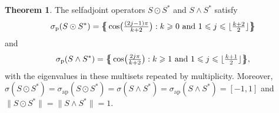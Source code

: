 \documentclass[10pt,reqno]{amsart}
\newcommand{\0}{{\color{lightgray}0}}
\renewcommand{\leq}{\leqslant}
\renewcommand{\geq}{\geqslant}
\newcommand{\norm}[1]{\| #1 \|}
\theoremstyle{definition}
\newtheorem{Theorem}[equation]{Theorem}
\numberwithin{equation}{section}
\begin{document}
\begin{Theorem}\label{Theorem:ShiftSpectra}
The selfadjoint operators $S \odot S^*$ and $S \wedge S^*$ satisfy
\begin{equation*}
\sigma_{\textrm{p}}(S \odot S^*)
=\big\{\hspace{-4.5pt}\big\{ \cos\! \big(  \tfrac{(2j-1) \pi} { k+2} \big)  : \text{$k \geq 0$ and $1\leq  j \leq  \lfloor \tfrac{k+2}{2} \rfloor$} \big\}\hspace{-4.5pt}\big\} 
\end{equation*}
and
\begin{equation*}
\sigma_{\textrm{p}}(S \wedge S^*)
=\big\{\hspace{-4.5pt}\big\{ \cos\! \big(  \tfrac{2j \pi} { k+2} \big)  : \text{$k \geq 1$ and $1\leq  j \leq  \lfloor \tfrac{k+1}{2} \rfloor$} \big\}\hspace{-4.5pt}\big\} ,
\end{equation*}
with the eigenvalues in these multisets repeated by multiplicity.  Moreover,
$\sigma (S \odot S^*) = \sigma_{\textrm{ap}} (S \odot S^*) =  \sigma (S \wedge S^*) = \sigma_{\textrm{ap}} (S \wedge S^*)  =  [-1,1]$
and $\norm{S \odot S^*} = \norm{S \wedge S^*}=1$.
\end{Theorem}
\end{document}
